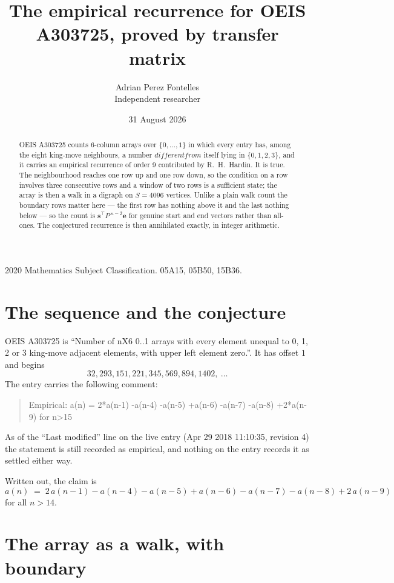 \documentclass[11pt,a4paper]{article}
\title{The empirical recurrence for OEIS A303725, proved by transfer matrix}
\author{Adrian Perez Fontelles\\ \small Independent researcher}
\date{31 August 2026}
\theoremstyle{plain}
\theoremstyle{definition}
\begin{document}
\maketitle

\begin{abstract}
OEIS A303725 counts $6$-column arrays over $\{0,\dots,1\}$ in which every entry has,
among the eight king-move neighbours, a number $different from$ itself lying in $\{0,1,2,3\}$, and it carries an empirical
recurrence of order $9$ contributed by R.~H.~Hardin. It is true. The neighbourhood
reaches one row up and one row down, so the condition on a row involves three consecutive
rows and a window of two rows is a sufficient state; the array is then a walk in a digraph
on $S=4096$ vertices. Unlike a plain walk count the boundary rows matter here --- the first
row has nothing above it and the last nothing below --- so the count is
$\mathbf{s}^{\!\top}P^{\,n-2}\mathbf{e}$ for genuine start and end vectors rather than
all-ones. The conjectured recurrence is then annihilated exactly, in integer arithmetic.
\end{abstract}

\noindent\small 2020 Mathematics Subject Classification. 05A15, 05B50, 15B36.\normalsize

\section{The sequence and the conjecture}

OEIS A303725 is ``Number of nX6 0..1 arrays with every element unequal to 0, 1, 2 or 3 king-move adjacent elements, with upper left element zero.''. It has offset
$1$ and begins
\[
32, 293, 151, 221, 345, 569, 894, 1402,\ \dots
\]
The entry carries the following comment:
\begin{quote}\small
Empirical: a(n) = 2*a(n-1) -a(n-4) -a(n-5) +a(n-6) -a(n-7) -a(n-8) +2*a(n-9) for n>15
\end{quote}
As of the ``Last modified'' line on the live entry (Apr 29 2018 11:10:35, revision
4) the statement is still recorded as empirical, and nothing on the entry
records it as settled either way.

Written out, the claim is
\begin{equation}\label{eq:conj}
a(n)\;=\;2\,a(n-1) - a(n-4) - a(n-5) + a(n-6) - a(n-7) - a(n-8) + 2\,a(n-9)
\end{equation}
for all $n>14$.

\section{The array as a walk, with boundary}
\end{document}
